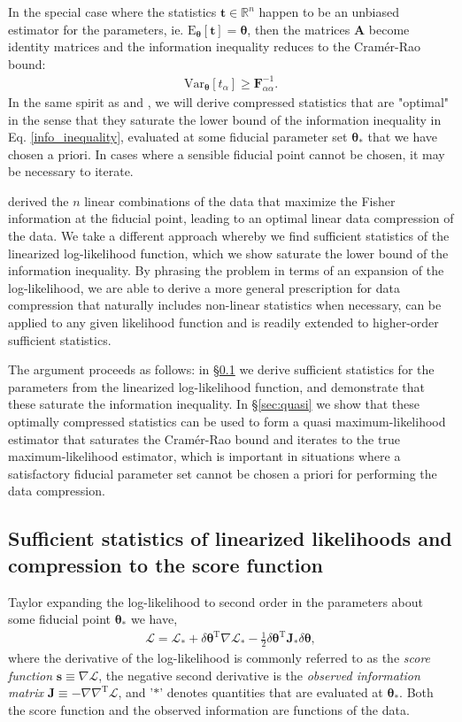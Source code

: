\documentclass[fleqn,usenatbib]{mnras}
\def\f{\frac}
\def\btheta{\boldsymbol{\theta}}
\def\fisher{\mathbf{F}}
\def\transpose{\mathrm{T}}
\def\L{\mathcal{L}}
\def\transpose{\mathrm{T}}
\def\score{\mathbf{s}}
\begin{document}
In the special case where the statistics $\mathbf{t}\in\mathbb{R}^n$ happen to be an unbiased estimator for the parameters, ie. $\mathrm{E}_{\boldsymbol\theta}\left[\mathbf{t}\right]=\btheta$, then the matrices $\mathbf{A}$ become identity matrices and the information inequality reduces to the Cram\'{e}r-Rao bound:
\begin{align}
\label{cramer_rao}
\mathrm{Var}_{\boldsymbol\theta}\left[t_\alpha\right] \geq \fisher^{-1}_{\alpha\alpha}.
\end{align}
%
In the same spirit as \citet{Tegmark1997} and \citet{Heavens2000a}, we will derive compressed statistics that are "optimal" in the sense that they saturate the lower bound of the information inequality in Eq. \eqref{info_inequality}, evaluated at some fiducial parameter set $\btheta_*$ that we have chosen a priori. In cases where a sensible fiducial point cannot be chosen, it may be necessary to iterate.

\citet{Heavens2000a} derived the $n$ linear combinations of the data that maximize the Fisher information at the fiducial point, leading to an optimal linear data compression of the data. We take a different approach whereby we find sufficient statistics of the linearized log-likelihood function, which we show saturate the lower bound of the information inequality. By phrasing the problem in terms of an expansion of the log-likelihood, we are able to derive a more general prescription for data compression that naturally includes non-linear statistics when necessary, can be applied to any given likelihood function and is readily extended to higher-order sufficient statistics.

The argument proceeds as follows: in \S \ref{sec:sufficient} we derive sufficient statistics for the parameters from the linearized log-likelihood function, and demonstrate that these saturate the information inequality. In \S \ref{sec:quasi} we show that these optimally compressed statistics can be used to form a quasi maximum-likelihood estimator that saturates the Cram\'{e}r-Rao bound and iterates to the true maximum-likelihood estimator, which is important in situations where a satisfactory fiducial parameter set cannot be chosen a priori for performing the data compression.
%
\subsection{Sufficient statistics of linearized likelihoods and compression to the score function}
\label{sec:sufficient}
%
Taylor expanding the log-likelihood to second order in the parameters about some fiducial point $\btheta_*$ we have,
\begin{align}
\label{taylor}
\L = \L_* + \delta\btheta^\transpose\nabla\L_* - \f{1}{2}\delta\btheta^\transpose\mathbf{J}_*\delta\btheta,
\end{align}
where the derivative of the log-likelihood is commonly referred to as the \emph{score function} $\score \equiv \nabla\L$, the negative second derivative is the \emph{observed information matrix} $\mathbf{J} \equiv -\nabla\nabla^\transpose\L$, and '$*$' denotes quantities that are evaluated at $\btheta_*$. Both the score function and the observed information are functions of the data.
\end{document}
